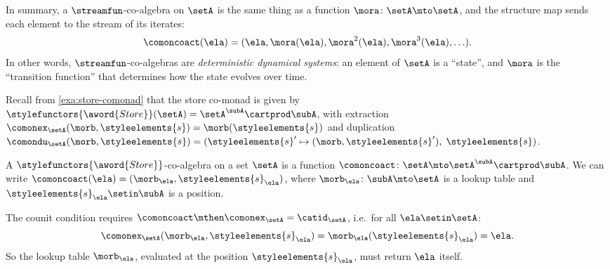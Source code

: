 \begin{example}
In summary, a $\streamfun$-co-algebra on $\setA$ is the same thing as a function $\mora \colon \setA \mto \setA$, and the structure map sends each element to the stream of its iterates:
\begin{equation*}
    \comoncoact(\ela) = (\ela, \mora(\ela), \mora^2(\ela), \mora^3(\ela), \ldots).
\end{equation*}
In other words, $\streamfun$-co-algebras are \emph{deterministic dynamical systems}: an element of $\setA$ is a ``state'', and $\mora$ is the ``transition function'' that determines how the state evolves over time.
\end{example}


\begin{example}
\label{exa:coalgebra-store-comonad}

Recall from \cref{exa:store-comonad} that the store co-monad is given by $\stylefunctors{\aword{Store}}(\setA) = \setA^{\subA} \cartprod \subA$, with extraction $\comonex_\setA(\morb, \styleelements{s}) = \morb(\styleelements{s})$ and duplication $\comondu_\setA(\morb, \styleelements{s}) = (\styleelements{s}' \mapsto (\morb, \styleelements{s}'),\; \styleelements{s})$.

A $\stylefunctors{\aword{Store}}$-co-algebra on a set $\setA$ is a function $\comoncoact \colon \setA \mto \setA^{\subA} \cartprod \subA$. We can write $\comoncoact(\ela) = (\morb_\ela, \styleelements{s}_\ela)$, where $\morb_\ela \colon \subA \mto \setA$ is a lookup table and $\styleelements{s}_\ela \setin \subA$ is a position.

The counit condition requires $\comoncoact \mthen \comonex_\setA = \catid_\setA$, i.e.\ for all $\ela \setin \setA$:
\begin{equation*}
    \comonex_\setA(\morb_\ela, \styleelements{s}_\ela) = \morb_\ela(\styleelements{s}_\ela) = \ela.
\end{equation*}
So the lookup table $\morb_\ela$, evaluated at the position $\styleelements{s}_\ela$, must return $\ela$ itself.


\end{example}
